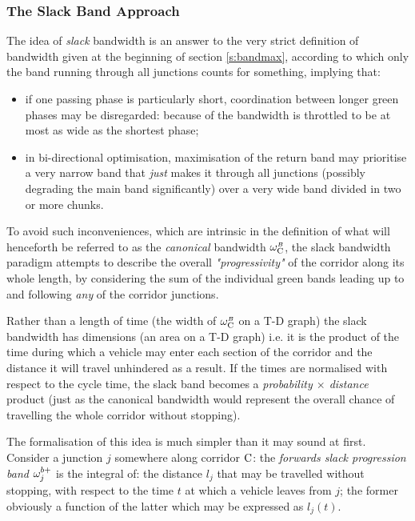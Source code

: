 \subsubsection{The Slack Band Approach} \label{s:slackband}
The idea of \emph{slack} bandwidth is an answer to the very strict definition of bandwidth given at the beginning of section \ref{s:bandmax}, according to which only the band running through all junctions counts for something, implying that:
\begin{itemize}
\item if one passing phase is particularly short, coordination between longer green phases may be disregarded: because of  the bandwidth is throttled to be at most as wide as the shortest phase;
\item in bi-directional optimisation, maximisation of the return band may prioritise a very narrow band that \emph{just} makes it through all junctions (possibly degrading the main band significantly) over a very wide band divided in two or more chunks.
\end{itemize}

To avoid such inconveniences, which are intrinsic in the definition of what will henceforth be referred to as the \emph{canonical} bandwidth $\omega_{\mathrm{C}}^{\scriptscriptstyle{B}}$, the slack bandwidth paradigm attempts to describe the overall \emph{"progressivity"} of the corridor along its whole length, by considering the sum of the individual green bands leading up to and following \emph{any} of the corridor junctions.

Rather than a length of time (the width of $\omega_{\mathrm{C}}^{\scriptscriptstyle{B}}$ on a T-D graph) the slack bandwidth has dimensions  (an area on a T-D graph) i.e. it is the product of the time during which a vehicle may enter each section of the corridor and the distance it will travel unhindered as a result. If the times are normalised with respect to the cycle time, the slack band becomes a \emph{probability $\times$ distance} product (just as the canonical bandwidth would represent the overall chance of travelling the whole corridor without stopping).

The formalisation of this idea is much simpler than it may sound at first. 
Consider a junction $j$ somewhere along corridor $\mathrm{C}$: the \emph{forwards slack progression band} $\omega_{j}^{\scriptstyle{b+}}$ is the integral of: the distance $l_j$ that may be travelled without stopping, with respect to the time $t$ at which a vehicle leaves from $j$; the former obviously a function of the latter which may be expressed as $l_j(t)$.


